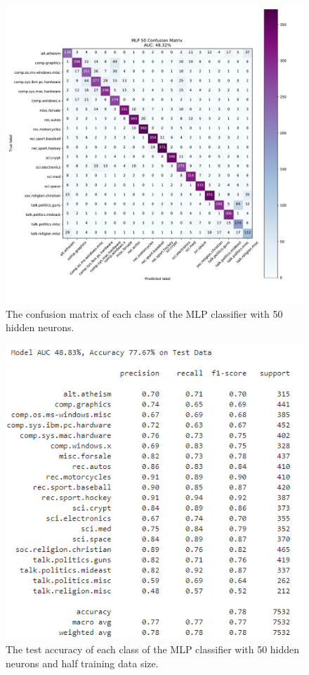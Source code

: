 \documentclass[twocolumn]{extarticle}
\begin{document}
\begin{appendices}
\begin{figure}[H]
\centering
\includegraphics[width=0.9\linewidth]{"charts/MLP 50"}
\caption{The confusion matrix of each class of the MLP classifier with 50 hidden neurons.}
\label{chart:mlp-50-conf}
\end{figure}

\begin{figure}
\centering
\includegraphics[width=0.9\linewidth]{charts/mlp-half-acc}
\caption{The test accuracy of each class of the MLP classifier with 50 hidden neurons and half training data size.}
\label{fig:mlp-half-acc}
\end{figure}


\end{appendices}
\end{document}
